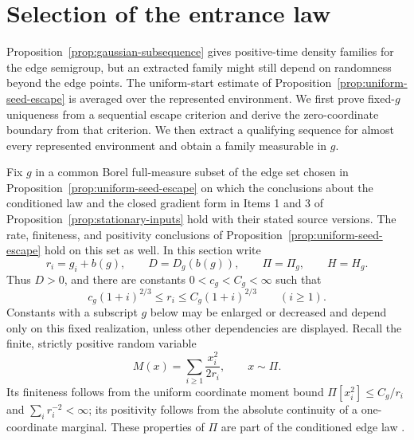 \section{Selection of the entrance law}\label{sec:entrance-selection}

Proposition~\ref{prop:gaussian-subsequence} gives positive-time density
families for the edge semigroup, but an extracted family might still depend
on randomness beyond the edge points.  The uniform-start estimate of
Proposition~\ref{prop:uniform-seed-escape} is averaged over the represented
environment.  We first prove fixed-\(g\) uniqueness from a sequential
escape criterion and derive the zero-coordinate boundary from that
criterion.  We then extract a qualifying sequence for almost every
represented environment and obtain a family measurable in \(g\).

Fix \(g\) in a common Borel full-measure subset of the edge set chosen
in Proposition~\ref{prop:uniform-seed-escape} on which the conclusions
about the conditioned law and the closed gradient form in Items 1 and 3
of Proposition~\ref{prop:stationary-inputs} hold with their stated
source versions.  The rate, finiteness, and positivity conclusions of
Proposition~\ref{prop:uniform-seed-escape} hold on this set as well.
In this section write
\[
 r_i=g_i+b(g),\qquad D=D_g(b(g)),\qquad \Pi=\Pi_g,\qquad H=H_g.
\]
Thus \(D>0\), and there are constants \(0<c_g<C_g<\infty\) such that
\begin{equation}\label{entr:rates}
 c_g(1+i)^{2/3}\le r_i\le C_g(1+i)^{2/3}\qquad(i\ge1).
\end{equation}
Constants with a subscript \(g\) below may be enlarged or decreased
and depend only on this fixed realization, unless other dependencies
are displayed.
Recall the finite, strictly positive random variable
\begin{equation}\label{entr:mass}
 M(x)=\sum_{i\ge1}\frac{x_i^2}{2r_i},\qquad x\sim\Pi.
\end{equation}
Its finiteness follows from the uniform coordinate moment bound
\(\Pi[x_i^2]\le C_g/r_i\) and \(\sum_i r_i^{-2}<\infty\); its positivity
follows from the absolute continuity of a one-coordinate marginal.
These properties of \(\Pi\) are part of the conditioned edge law
\cite[Proposition~2.3]{FUA}.

